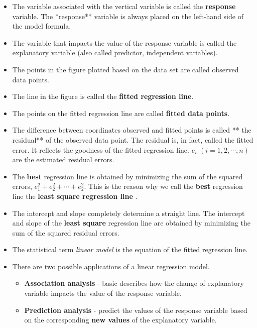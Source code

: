 \documentclass[
]{book}
\begin{document}
\begin{itemize}
\item
  The variable associated with the vertical variable is called the \textbf{response} variable. The *response** variable is always placed on the left-hand side of the model formula.
\item
  The variable that impacts the value of the response variable is called the explanatory variable (also called predictor, independent variables).
\item
  The points in the figure plotted based on the data set are called observed data points.
\item
  The line in the figure is called the \textbf{fitted regression line}.
\item
  The points on the fitted regression line are called \textbf{fitted data points}.
\item
  The difference between coordinates observed and fitted points is called ** the residual** of the observed data point. The residual is, in fact, called the fitted error. It reflects the goodness of the fitted regression line. \(e_i\) \((i = 1 ,2 ,\cdots, n)\) are the estimated residual errors.
\item
  The \textbf{best} regression line is obtained by minimizing the sum of the squared errors, \(e_1^2 +e_2^2+\cdots + e_2^2\). This is the reason why we call the \textbf{best} regression line the \textbf{least square regression line} .
\item
  The intercept and slope completely determine a straight line. The intercept and slope of the \textbf{least square} regression line are obtained by minimizing the sum of the squared residual errors.
\item
  The statistical term \emph{linear model} is the equation of the fitted regression line.
\item
  There are two possible applications of a linear regression model.

  \begin{itemize}
  \item
    \textbf{Association analysis} - basic describes how the change of explanatory variable impacts the value of the response variable.
  \item
    \textbf{Prediction analysis} - predict the values of the response variable based on the corresponding \textbf{new values} of the explanatory variable.
  \end{itemize}
\end{itemize}
\end{document}
